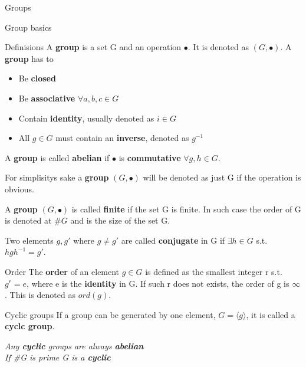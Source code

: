 \documentclass[12pt, letterpaper]{article}
\begin{document}
\begin{section}{Groups}

  \begin{subsection}{Group basics}

    \begin{subsubsection}{Definisions}
      A \textbf{group} is a set G and an operation \(\bullet\). It is denoted as
      \((G, \bullet)\). A \textbf{group} has to
      \begin{itemize}
        \item Be \textbf{closed}
        \item Be \textbf{associative} \(\forall a,b,c \in G\)
        \item Contain \textbf{identity}, usually denoted as \(i \in G\)
        \item All \(g \in G\) must contain an \textbf{inverse}, denoted as \(g^{-1}\)
      \end{itemize}
      A \textbf{group} is called \textbf{abelian} if \(\bullet\) is \textbf{commutative}
      \(\forall g, h \in G\).

      For simplisitys sake a \textbf{group} \((G, \bullet)\) will be denoted as just G
      if the operation is obvious.

      A \textbf{group} \((G, \bullet)\) is called \textbf{finite} if the set G is finite.
      In such case the order of G is denoted at \(\#G\) and is the size of the set G.

      Two elements \(g, g'\) where \(g \neq g'\) are called \textbf{conjugate} in G
      if \(\exists h \in G \) s.t. \(hgh^{-1} = g'\).
    \end{subsubsection}

    \begin{subsubsection}{Order}
      The \textbf{order} of an element \(g \in G\) is defined as the smallest
      integer r s.t. \(g^{r} = e\), where e is the \textbf{identity} in G.
      If such r does not exists, the order of g is \(\infty\).
      This is denoted as \(ord(g)\).
    \end{subsubsection}

    \begin{subsubsection}{Cyclic groups}
      If a group can be generated by one element, \(G = \langle g \rangle\),
      it is called a \textbf{cyclc group}.

      \emph{Any \textbf{cyclic} groups are always \textbf{abelian}} \\
      \emph{If \#G is prime G is a \textbf{cyclic}}
    \end{subsubsection}


\end{subsection}
\end{section}
\end{document}

